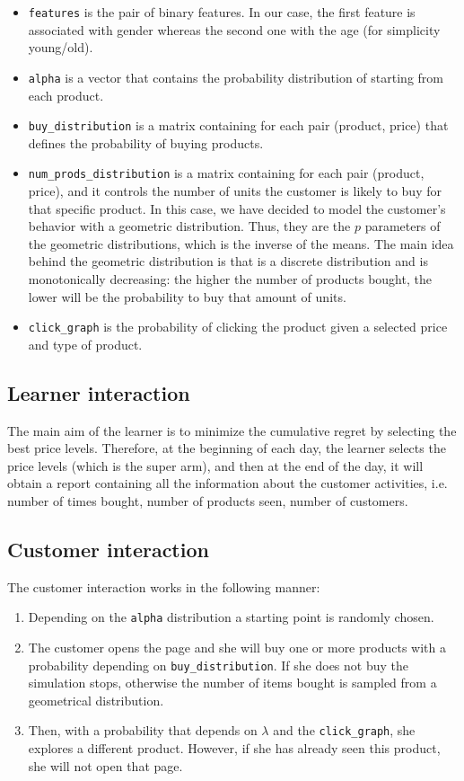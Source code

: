 \begin{itemize}
    \item \verb|features| is the pair of binary features. In our case, the first feature is associated with gender whereas the second one with the age (for simplicity young/old).
    \item \verb|alpha| is a vector that contains the probability distribution of starting from each product.
    \item \verb|buy_distribution| is a matrix containing for each pair (product, price) that defines the probability of buying products.
    \item \verb|num_prods_distribution| is a matrix containing for each pair (product, price), and it controls the number of units the customer is likely to buy for that specific product. In this case, we have decided to model the customer's behavior with a geometric distribution. Thus, they are the \(p\) parameters of the geometric distributions, which is the inverse of the means.
    The main idea behind the geometric distribution is that is a discrete distribution and is monotonically decreasing: the higher the number of products bought, the lower will be the probability to buy that amount of units.
    \item \verb|click_graph| is the probability of clicking the product given a selected price and type of product.
\end{itemize}

\subsection{Learner interaction}
The main aim of the learner is to minimize the cumulative regret by selecting the best price levels.
Therefore, at the beginning of each day, the learner selects the price levels (which is the super arm), and then at the end of the day, it will obtain a report containing all the information about the customer activities, i.e. number of times bought, number of products seen, number of customers.


\subsection{Customer interaction}
The customer interaction works in the following manner:
\begin{enumerate}
    \item Depending on the \verb|alpha| distribution a starting point is randomly chosen.
    \item The customer opens the page and she will buy one or more products with a probability depending on \verb|buy_distribution|. If she does not buy the simulation stops, otherwise the number of items bought is sampled from a geometrical distribution.
    \item Then, with a probability that depends on \(\lambda\) and the \verb|click_graph|, she explores a different product. However, if she has already seen this product, she will not open that page.
\end{enumerate}

